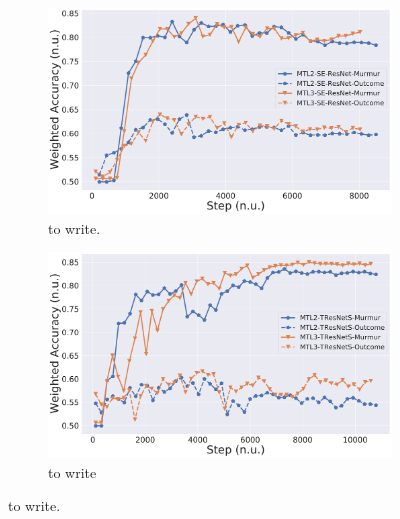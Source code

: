 
\begin{figure}
\centering
\begin{subfigure}[b]{0.49\linewidth}
    \centering
    \includegraphics[width=\textwidth]{images/se-resnet-clf-vs-mtl.pdf}
    \caption[]
    {to write.}
    \label{fig:se-resnet-clf-vs-mtl}
\end{subfigure}
\hfill
\begin{subfigure}[b]{0.49\linewidth}
    \centering
    \includegraphics[width=\textwidth]{images/tresnets-clf-vs-mtl.pdf}
    \caption[]
    {to write}
    \label{fig:tresnets-clf-vs-mtl}
\end{subfigure}
\caption[]
{to write.}
\label{fig:mtl}
\end{figure}
